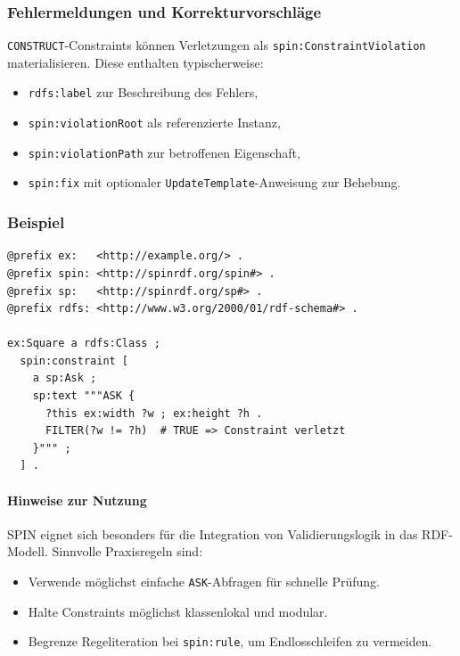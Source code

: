 \subsubsection{Fehlermeldungen und Korrekturvorschläge}
\texttt{CONSTRUCT}-Constraints können Verletzungen als \texttt{spin:ConstraintViolation} materialisieren. Diese enthalten typischerweise:
\begin{itemize}
\item \texttt{rdfs:label} zur Beschreibung des Fehlers,
\item \texttt{spin:violationRoot} als referenzierte Instanz,
\item \texttt{spin:violationPath} zur betroffenen Eigenschaft,
\item \texttt{spin:fix} mit optionaler \texttt{UpdateTemplate}-Anweisung zur Behebung.
\end{itemize}

\subsubsection{Beispiel}
\begin{lstlisting}[language=turtle,basicstyle=\ttfamily\small,caption={SPIN-Constraint: Quadrat konsistent halten},label={lst:spin-constraint}]
@prefix ex:   <http://example.org/> .
@prefix spin: <http://spinrdf.org/spin#> .
@prefix sp:   <http://spinrdf.org/sp#> .
@prefix rdfs: <http://www.w3.org/2000/01/rdf-schema#> .

ex:Square a rdfs:Class ;
  spin:constraint [
    a sp:Ask ;
    sp:text """ASK {
      ?this ex:width ?w ; ex:height ?h .
      FILTER(?w != ?h)  # TRUE => Constraint verletzt
    }""" ;
  ] .
\end{lstlisting}

\paragraph{Hinweise zur Nutzung}
SPIN eignet sich besonders für die Integration von Validierungslogik in das RDF-Modell. Sinnvolle Praxisregeln sind:
\begin{itemize}
\item Verwende möglichst einfache \texttt{ASK}-Abfragen für schnelle Prüfung.
\item Halte Constraints möglichst klassenlokal und modular.
\item Begrenze Regeliteration bei \texttt{spin:rule}, um Endlosschleifen zu vermeiden.
\end{itemize}

